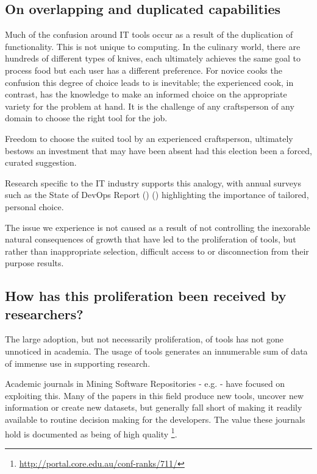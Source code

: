 \subsection{On overlapping and duplicated capabilities}

Much of the confusion around IT tools occur as a result of the duplication of functionality. This is not unique to computing. In the culinary world, there are hundreds of different types of knives, each ultimately achieves the same goal to process food but each user has a different preference. For novice cooks the confusion this degree of choice leads to is inevitable; the experienced cook, in contrast, has the knowledge to make an informed choice on the appropriate variety for the problem at hand. It is the challenge of any craftsperson of any domain to choose the right tool for the job.

Freedom to choose the suited tool by an experienced craftsperson, ultimately bestows an investment that may have been absent had this election been a forced, curated suggestion.

Research specific to the IT industry supports this analogy, with annual surveys such as the State of DevOps Report () ()  highlighting the importance of tailored, personal choice. 

The issue we experience is not caused as a result of not controlling the inexorable natural consequences of growth that have led to the proliferation of tools, but rather than inappropriate selection, difficult access to or disconnection from their purpose results.

\subsection{How has this proliferation been received by researchers?}

The large adoption, but not necessarily proliferation, of tools has not gone unnoticed in academia. The usage of tools generates an innumerable sum of data of immense use in supporting research.

Academic journals in Mining Software Repositories - e.g. \cite{Storey:2019:3341883} - have focused on exploiting this. Many of the papers in this field produce new tools, uncover new information or create new datasets, but generally fall short of making it readily available to routine decision making for the developers. The value these journals hold is documented as being of high quality \footnote{\url{http://portal.core.edu.au/conf-ranks/711/}}.

